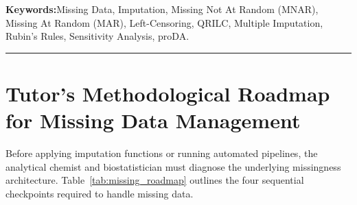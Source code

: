 \documentclass[11pt,oneside]{book}
\begin{document}
\noindent
\textbf{Keywords:}\enspace Missing Data, Imputation, Missing Not At Random (MNAR), Missing At Random (MAR), Left-Censoring, QRILC, Multiple Imputation, Rubin's Rules, Sensitivity Analysis, proDA.

\vspace{0.8em}
\noindent\rule{\textwidth}{0.4pt}

\section{Tutor's Methodological Roadmap for Missing Data Management}

Before applying imputation functions or running automated pipelines, the analytical chemist and biostatistician must diagnose the underlying missingness architecture. Table~\ref{tab:missing_roadmap} outlines the four sequential checkpoints required to handle missing data.
\end{document}
